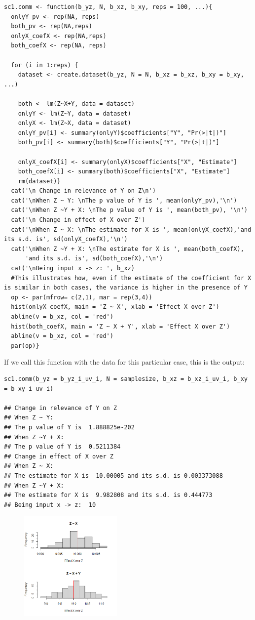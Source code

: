 \documentclass{article}
\begin{document}
\begin{lstlisting}
sc1.comm <- function(b_yz, N, b_xz, b_xy, reps = 100, ...){
  onlyY_pv <- rep(NA, reps)
  both_pv <- rep(NA,reps)
  onlyX_coefX <- rep(NA,reps)
  both_coefX <- rep(NA, reps)
  
  for (i in 1:reps) {
    dataset <- create.dataset(b_yz, N = N, b_xz = b_xz, b_xy = b_xy, ...)
    
    both <- lm(Z~X+Y, data = dataset)
    onlyY <- lm(Z~Y, data = dataset)
    onlyX <- lm(Z~X, data = dataset)
    onlyY_pv[i] <- summary(onlyY)$coefficients["Y", "Pr(>|t|)"]
    both_pv[i] <- summary(both)$coefficients["Y", "Pr(>|t|)"]
    
    onlyX_coefX[i] <- summary(onlyX)$coefficients["X", "Estimate"]
    both_coefX[i] <- summary(both)$coefficients["X", "Estimate"]
    rm(dataset)}
  cat('\n Change in relevance of Y on Z\n')
  cat('\nWhen Z ~ Y: \nThe p value of Y is ', mean(onlyY_pv),'\n')
  cat('\nWhen Z ~Y + X: \nThe p value of Y is ', mean(both_pv), '\n')
  cat('\n Change in effect of X over Z')
  cat('\nWhen Z ~ X: \nThe estimate for X is ', mean(onlyX_coefX),'and its s.d. is', sd(onlyX_coefX),'\n')
  cat('\nWhen Z ~Y + X: \nThe estimate for X is ', mean(both_coefX), 
      'and its s.d. is', sd(both_coefX),'\n')
  cat('\nBeing input x -> z: ', b_xz)
  #This illustrates how, even if the estimate of the coefficient for X is similar in both cases, the variance is higher in the presence of Y
  op <- par(mfrow= c(2,1), mar = rep(3,4))
  hist(onlyX_coefX, main = 'Z ~ X', xlab = 'Effect X over Z')
  abline(v = b_xz, col = 'red')
  hist(both_coefX, main = 'Z ~ X + Y', xlab = 'Effect X over Z')
  abline(v = b_xz, col = 'red')
  par(op)}
\end{lstlisting}

If we call this function with the data for this particular case, this is the output:

\begin{lstlisting}
sc1.comm(b_yz = b_yz_i_uv_i, N = samplesize, b_xz = b_xz_i_uv_i, b_xy = b_xy_i_uv_i)

## Change in relevance of Y on Z
## When Z ~ Y: 
## The p value of Y is  1.888825e-202 
## When Z ~Y + X: 
## The p value of Y is  0.5211384 
## Change in effect of X over Z
## When Z ~ X: 
## The estimate for X is  10.00005 and its s.d. is 0.003373088 
## When Z ~Y + X: 
## The estimate for X is  9.982808 and its s.d. is 0.444773 
## Being input x -> z:  10
\end{lstlisting}

\begin{figure}[h]
\includegraphics[width=5cm]{i_uv_i1.png}
\centering
\end{figure}
\end{document}
